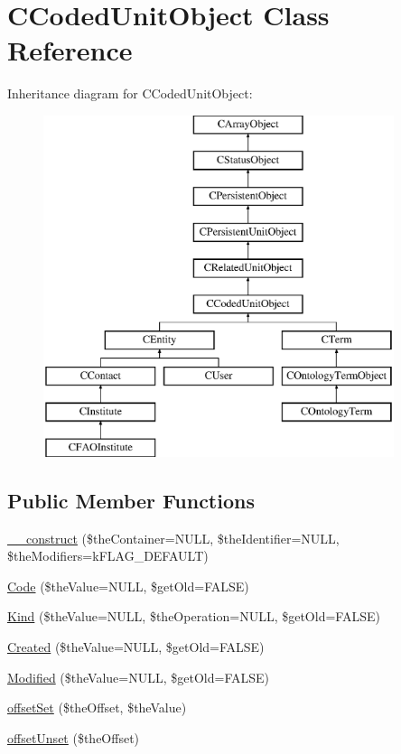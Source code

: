\hypertarget{class_c_coded_unit_object}{\section{C\-Coded\-Unit\-Object Class Reference}
\label{class_c_coded_unit_object}
}
Inheritance diagram for C\-Coded\-Unit\-Object\-:\begin{figure}[H]
\begin{center}
\leavevmode
\includegraphics[height=10.000000cm]{class_c_coded_unit_object}
\end{center}
\end{figure}
\subsection*{Public Member Functions}
\begin{DoxyCompactItemize}
\item 
\hyperlink{class_c_coded_unit_object_a314fc62af62314f5ac5acca2ac809900}{\-\_\-\-\_\-construct} (\$the\-Container=N\-U\-L\-L, \$the\-Identifier=N\-U\-L\-L, \$the\-Modifiers=k\-F\-L\-A\-G\-\_\-\-D\-E\-F\-A\-U\-L\-T)
\item 
\hyperlink{class_c_coded_unit_object_a56af949800e65f9a283239d2e455259f}{Code} (\$the\-Value=N\-U\-L\-L, \$get\-Old=F\-A\-L\-S\-E)
\item 
\hyperlink{class_c_coded_unit_object_aafe9f12551f9f183c21a9865f0e9c670}{Kind} (\$the\-Value=N\-U\-L\-L, \$the\-Operation=N\-U\-L\-L, \$get\-Old=F\-A\-L\-S\-E)
\item 
\hyperlink{class_c_coded_unit_object_a6cbad4f609a1a247dcd955d588750668}{Created} (\$the\-Value=N\-U\-L\-L, \$get\-Old=F\-A\-L\-S\-E)
\item 
\hyperlink{class_c_coded_unit_object_a0943e9d09e1078908938970b02a4b586}{Modified} (\$the\-Value=N\-U\-L\-L, \$get\-Old=F\-A\-L\-S\-E)
\item 
\hyperlink{class_c_coded_unit_object_a49bb8f2956cb0551ba827b222778f295}{offset\-Set} (\$the\-Offset, \$the\-Value)
\item 
\hyperlink{class_c_coded_unit_object_a5072e0f72c19260df212a4cf93c9f1cb}{offset\-Unset} (\$the\-Offset)
\end{DoxyCompactItemize}

